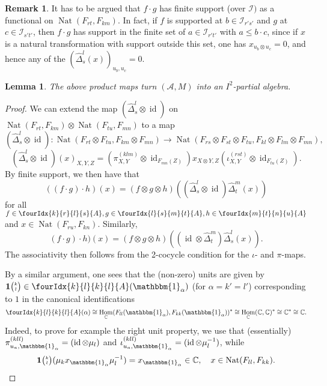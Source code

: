 \documentclass[11pt]{article}
\DeclareMathOperator{\id}{id}
\DeclareMathOperator{\Hom}{Hom}
\DeclareMathOperator{\Nat}{\mathrm{Nat}}
\newcommand{\C}{\mathbb{C}}
\newcommand{\Grt}[3]{#1{\tiny {\begin{pmatrix} #2\\#3\end{pmatrix}}}}
\newcommand{\Unitb}{\mathbbm{1}}
\newcommand{\UnitC}[2]{\Grt{\mathbf{1}}{#1}{#2}}
\newcommand{\Gr}[5]{\fourIdx{#2}{#4}{#3}{#5}{#1}}%
\newtheorem{Lem}[Theorem]{Lemma}
\theoremstyle{definition}
\newtheorem{Rem}[Theorem]{Remark}
\numberwithin{equation}{section}
\begin{document}
\begin{Rem} It has to be argued that $f\cdot g$ has finite support (over $\mathcal{I})$ as a functional on $\Nat(F_{rt},F_{km})$. In fact, if $f$ is supported at $b\in \mathcal{I}_{r's'}$ and $g$ at $c\in \mathcal{I}_{s't'}$, then $f\cdot g$ has support in the finite set of $a\in \mathcal{I}_{r't'}$ with $a\leq b\cdot c$, since if $x$ is a natural transformation with support outside this set, one has $x_{u_b\otimes u_c}=0$, and hence any of the $\left(\hat{\Delta}^l_s(x)\right)_{u_b,u_c} =0$.
\end{Rem}

\begin{Lem} The above product maps turn $(\mathscr{A},M)$ into an $I^2$-partial algebra.
\end{Lem}
\begin{proof} We can extend the map $(\hat{\Delta}^l_s\otimes \id)$ on $\Nat(F_{rt},F_{km})\otimes \Nat(F_{tu},F_{mn})$ to a map \[(\hat{\Delta}^l_s\otimes \id): \Nat(F_{rt}\otimes F_{tu},F_{km}\otimes F_{mn}) \rightarrow  \Nat(F_{rs}\otimes F_{st}\otimes F_{tu},F_{kl}\otimes F_{lm}\otimes F_{mn}),\] \[(\hat{\Delta}^l_s\otimes \id)(x)_{X,Y,Z} = \left(\pi^{(klm)}_{X,Y}\otimes \id_{F_{mn}(Z)}\right) x_{X\otimes Y, Z} \left(\iota^{(rst)}_{X,Y} \otimes \id_{F_{tu}(Z)}\right).\]
By finite support, we then have that \[((f\cdot g)\cdot h)(x) = (f\otimes g\otimes h)((\hat{\Delta}^l_s\otimes \id)\hat{\Delta}^m_t(x))\] for all $f\in \Gr{A}{k}{l}{r}{s},g\in \Gr{A}{l}{m}{s}{t},h\in \Gr{A}{m}{n}{t}{u}$ and $x\in  \Nat(F_{ru},F_{kn})$. Similarly, \[(f\cdot g)\cdot h)(x) = (f\otimes g\otimes h)((\id\otimes \hat{\Delta}^m_t)\hat{\Delta}^l_s(x)).\] The associativity then follows from the 2-cocycle condition for the $\iota$- and $\pi$-maps. 

By a similar argument, one sees that the (non-zero) units are given by $\UnitC{k}{l}\in \Gr{A}{k}{k}{l}{l}(\Unitb_{\alpha})$  (for $\alpha=k'=l'$) corresponding to $1$ in the canonical identifications  \[\Gr{A}{k}{k}{l}{l}(\alpha) \cong \Hom_{\C}(F_{ll}(\Unitb_{\alpha}),F_{kk}(\Unitb_{\alpha}))^*\cong \Hom_{\C}(\C,\C)^*  \cong \C^* \cong \C.\] Indeed, to prove for example the right unit property, we use that (essentially) $\pi_{u_a,\Unitb_{\alpha}}^{(kll)} =(\id\otimes \mu_l)$ and $\iota_{u_a,\Unitb_{\alpha}}^{(kll)} = (\id\otimes \mu_l^{-1})$, while \[\UnitC{k}{l}(\mu_kx_{\Unitb_{\alpha}}\mu_l^{-1}) = x_{\Unitb_{\alpha}} \in \C,\quad x\in \Nat(F_{ll},F_{kk}).\] %
\end{proof} 
\end{document}
